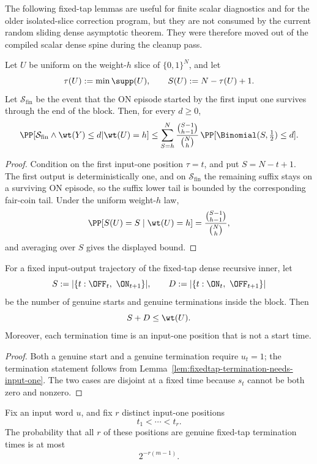 The following fixed-tap lemmas are useful for finite scalar diagnostics and for the older isolated-slice correction
program, but they are not consumed by the current random sliding dense asymptotic theorem. They were therefore moved out
of the compiled scalar dense spine during the cleanup pass.

\begin{lemma}
\label{lem:fixedtap-final-survivor-suffix}
Let \(U\) be uniform on the weight-\(h\) slice of \(\{0,1\}^N\), and let
\[
\tau(U):=\min\supp(U),\qquad S(U):=N-\tau(U)+1.
\]
Let \(\mathcal{S}_{\mathrm{fin}}\) be the event that the ON episode started by the first input one survives through the
end of the block. Then, for every \(d\ge 0\),
\[
\PP\!\left[
\mathcal{S}_{\mathrm{fin}}\wedge \wt(Y)\le d
\middle| \wt(U)=h
\right]
\le
\sum_{S=h}^{N}
\frac{\binom{S-1}{h-1}}{\binom{N}{h}}\,
\PP[\Binomial(S,\tfrac12)\le d].
\]
\end{lemma}

\begin{proof}
Condition on the first input-one position \(\tau=t\), and put \(S=N-t+1\). The first output is deterministically one,
and on \(\mathcal{S}_{\mathrm{fin}}\) the remaining suffix stays on a surviving ON episode, so the suffix lower tail is
bounded by the corresponding fair-coin tail. Under the uniform weight-\(h\) law,
\[
\PP[S(U)=S\mid \wt(U)=h]=\frac{\binom{S-1}{h-1}}{\binom{N}{h}},
\]
and averaging over \(S\) gives the displayed bound.
\end{proof}

\begin{lemma}
\label{lem:fixedtap-episode-budget}
For a fixed input-output trajectory of the fixed-tap dense recursive inner, let
\[
S:=|\{t:\OFF_t,\ \ON_{t+1}\}|,
\qquad
D:=|\{t:\ON_t,\ \OFF_{t+1}\}|
\]
be the number of genuine starts and genuine terminations inside the block. Then
\[
S+D \le \wt(U).
\]
Moreover, each termination time is an input-one position that is not a start time.
\end{lemma}

\begin{proof}
Both a genuine start and a genuine termination require \(u_t=1\); the termination statement follows from
Lemma~\ref{lem:fixedtap-termination-needs-input-one}. The two cases are disjoint at a fixed time because \(s_t\)
cannot be both zero and nonzero.
\end{proof}

\begin{lemma}
\label{lem:fixedtap-multicandidate-termination}
Fix an input word \(u\), and fix \(r\) distinct input-one positions
\[
t_1<\cdots<t_r.
\]
The probability that all \(r\) of these positions are genuine fixed-tap termination times is at most
\[
2^{-r(m-1)}.
\]
\end{lemma}

